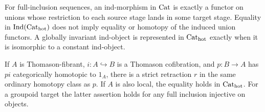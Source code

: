 \begin{proposition}
\label{F:C28-retractions}
For full-inclusion sequences, an ind-morphism in $\mathrm {Cat}$ is exactly a
functor on unions whose restriction to each source stage lands in some
target stage. Equality in $\operatorname{Ind}(\mathrm {Cat}_{\mathrm{hot}})$
does not imply equality or homotopy of the induced union functors.
A globally invariant ind-object is represented in $\mathrm {Cat}_{\mathrm{hot}}$
exactly when it is isomorphic to a constant ind-object.

If $A$ is Thomason-fibrant, $i:A\hookrightarrow B$ is a Thomason
cofibration, and $p:B\to A$ has $pi$ categorically homotopic to $1_A$,
there is a strict retraction $r$ in the same ordinary homotopy class as
$p$. If $A$ is also local, the equality holds in
$\mathrm {Cat}_{\mathrm{hot}}$. For a groupoid target the latter assertion
holds for any full inclusion injective on objects.
\end{proposition}
